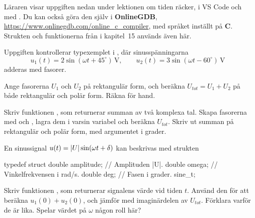 Läraren visar uppgiften nedan under lektionen om tiden räcker, i VS Code och med .
Du kan också göra den
själv i \textbf{OnlineGDB}, \url{https://www.onlinegdb.com/online_c_compiler}, med språket inställt
på \textbf{C}. Strukten  och funktionerna från  i kapitel~15 används
även här.

Uppgiften kontrollerar typexemplet i , där sinusspänningarna
\[
  u_1(t) = 2\sin(\omega t + 45^{\circ})\,\text{V}, \qquad
  u_2(t) = 3\sin(\omega t - 60^{\circ})\,\text{V}
\]
adderas med fasorer.
\begin{parts}
  \item Ange fasorerna $U_1$ och $U_2$ på rektangulär form, och beräkna $U_{tot} = U_1 + U_2$ på
    både rektangulär och polär form. Räkna för hand.
  \item Skriv funktionen , som
    returnerar summan av två komplexa tal. Skapa fasorerna med 
    och , lagra dem i varsin variabel och beräkna $U_{tot}$.
    Skriv ut summan på rektangulär och polär form, med argumentet i grader.
  \item En sinussignal $u(t) = \lvert U\rvert\sin(\omega t + \delta)$ kan beskrivas med strukten
\begin{ccode}
typedef struct
{
    double amplitude; // Amplituden |U|.
    double omega;     // Vinkelfrekvensen i rad/s.
    double deg;       // Fasen i grader.
} sine_t;
\end{ccode}
    Skriv funktionen , som returnerar
    signalens värde vid tiden $t$. Använd den för att beräkna $u_1(0) + u_2(0)$, och jämför med
    imaginärdelen av $U_{tot}$. Förklara varför de är lika. Spelar värdet på $\omega$ någon roll här?
\end{parts}
